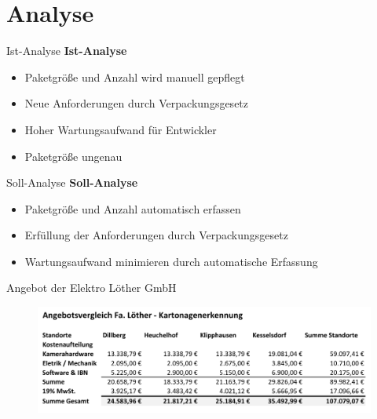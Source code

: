 \documentclass[10pt,ngerman]{beamer}
\begin{document}



\section{Analyse}
\begin{frame}[fragile]{Ist-Analyse}
  \textbf{Ist-Analyse}
  \begin{itemize}
    \item Paketgröße und Anzahl wird manuell gepflegt
          \pause
    \item Neue Anforderungen durch  Verpackungsgesetz
          \pause
    \item Hoher Wartungsaufwand für Entwickler
          \pause
    \item Paketgröße ungenau
  \end{itemize}
\end{frame}


\begin{frame}[fragile]{Soll-Analyse}
  \textbf{Soll-Analyse}
  \begin{itemize}
    \item Paketgröße und Anzahl automatisch erfassen
          \pause
    \item Erfüllung der Anforderungen durch Verpackungsgesetz
          \pause
    \item Wartungsaufwand minimieren durch automatische Erfassung
  \end{itemize}
\end{frame}


\begin{frame}[fragile]{Angebot der Elektro Löther GmbH}
  \begin{figure}[htpb]
    \centering
    \includegraphics[width=1\textwidth]{pics/AngebotLoether.png}
  \end{figure}
\end{frame}
\end{document}
